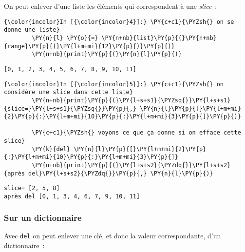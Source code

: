     On peut enlever d'une liste les éléments qui correspondent à une
\emph{slice}~:

    \begin{Verbatim}[commandchars=\\\{\},frame=single,framerule=0.3mm,rulecolor=\color{cellframecolor}]
{\color{incolor}In [{\color{incolor}4}]:} \PY{c+c1}{\PYZsh{} on se donne une liste}
        \PY{n}{l} \PY{o}{=} \PY{n+nb}{list}\PY{p}{(}\PY{n+nb}{range}\PY{p}{(}\PY{l+m+mi}{12}\PY{p}{)}\PY{p}{)}
        \PY{n+nb}{print}\PY{p}{(}\PY{n}{l}\PY{p}{)}
\end{Verbatim}


    \begin{Verbatim}[commandchars=\\\{\},frame=single,framerule=0.3mm,rulecolor=\color{cellframecolor}]
[0, 1, 2, 3, 4, 5, 6, 7, 8, 9, 10, 11]
\end{Verbatim}

    \begin{Verbatim}[commandchars=\\\{\},frame=single,framerule=0.3mm,rulecolor=\color{cellframecolor}]
{\color{incolor}In [{\color{incolor}5}]:} \PY{c+c1}{\PYZsh{} on considère une slice dans cette liste}
        \PY{n+nb}{print}\PY{p}{(}\PY{l+s+s1}{\PYZsq{}}\PY{l+s+s1}{slice=}\PY{l+s+s1}{\PYZsq{}}\PY{p}{,} \PY{n}{l}\PY{p}{[}\PY{l+m+mi}{2}\PY{p}{:}\PY{l+m+mi}{10}\PY{p}{:}\PY{l+m+mi}{3}\PY{p}{]}\PY{p}{)}
        
        \PY{c+c1}{\PYZsh{} voyons ce que ça donne si on efface cette slice}
        \PY{k}{del} \PY{n}{l}\PY{p}{[}\PY{l+m+mi}{2}\PY{p}{:}\PY{l+m+mi}{10}\PY{p}{:}\PY{l+m+mi}{3}\PY{p}{]}
        \PY{n+nb}{print}\PY{p}{(}\PY{l+s+s2}{\PYZdq{}}\PY{l+s+s2}{après del}\PY{l+s+s2}{\PYZdq{}}\PY{p}{,} \PY{n}{l}\PY{p}{)}
\end{Verbatim}


    \begin{Verbatim}[commandchars=\\\{\},frame=single,framerule=0.3mm,rulecolor=\color{cellframecolor}]
slice= [2, 5, 8]
après del [0, 1, 3, 4, 6, 7, 9, 10, 11]
\end{Verbatim}

    \hypertarget{sur-un-dictionnaire}{%
\subsubsection{Sur un dictionnaire}\label{sur-un-dictionnaire}}

    Avec \texttt{del} on peut enlever une clé, et donc la valeur
correspondante, d'un dictionnaire~:

